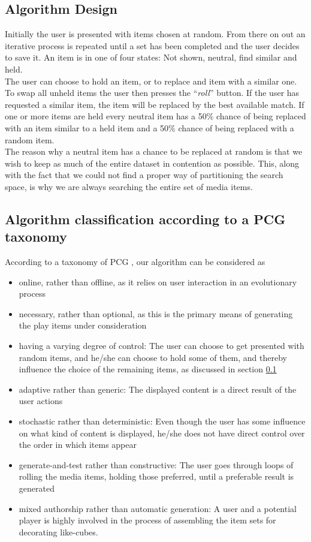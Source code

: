 \documentclass[conference]{IEEETran}
\begin{document}
\subsection{Algorithm Design}
\label{sec:AlgorithmDesign}
Initially the user is presented with items chosen at random. From there on out an iterative process is repeated until a set has been completed and the user decides to save it.
An item is in one of four states: Not shown, neutral, find similar and held.\\
The user can choose to hold an item, or to replace and item with a similar one. To swap all unheld items the user then presses the ``\textit{roll}'' button. If the user has requested a similar item, the item will be replaced by the best available match. If one or more items are held every neutral item has a 50\% chance of being replaced with an item similar to a held item and a 50\% chance of being replaced with a random item.\\
The reason why a neutral item has a chance to be replaced at random is that we wish to keep as much of the entire dataset in contention as possible. This, along with the fact that we could not find a proper way of partitioning the search space, is why we are always searching the entire set of media items.

\subsection{Algorithm classification according to a PCG taxonomy}

According to a taxonomy of PCG \cite{togelius2014introduction}, our algorithm can be considered as
\begin{itemize}
    \item online, rather than offline, as it relies on user interaction in an evolutionary process
    \item necessary, rather than optional, as this is the primary means of generating the play items under consideration
    \item having a varying degree of control:  The user can choose to get presented with random items, and he/she can choose to hold some of them, and thereby influence the choice of the remaining items, as discussed in section \ref{sec:AlgorithmDesign}
    \item adaptive rather than generic:  The displayed content is a direct result of the user actions
    \item stochastic rather than deterministic:  Even though the user has some influence on what kind of content is displayed, he/she does not have direct control over the order in which items appear
    \item generate-and-test rather than constructive:  The user goes through loops of rolling the media items, holding those preferred, until a preferable result is generated
    \item mixed authorship rather than automatic generation:  A user and a potential player is highly involved in the process of assembling the item sets for decorating like-cubes.
\end{itemize}
\end{document}
